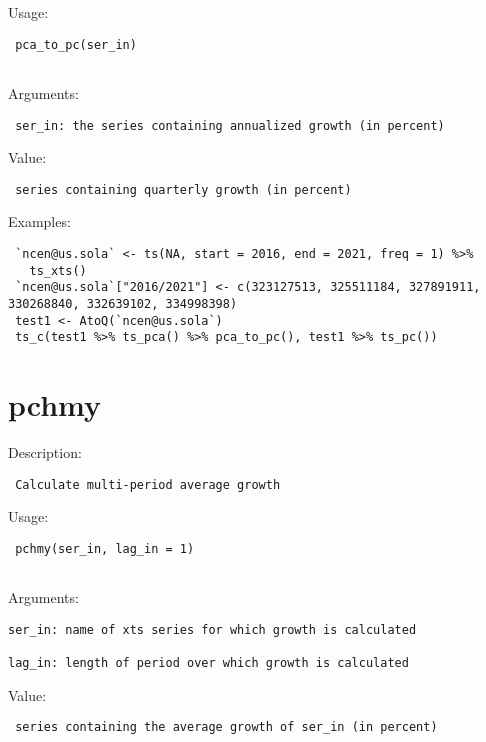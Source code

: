 \documentclass[
  letterpaper,
  DIV=11,
  numbers=noendperiod]{scrreport}
\begin{document}
Usage:

\begin{verbatim}
 pca_to_pc(ser_in)
 
\end{verbatim}

Arguments:

\begin{verbatim}
 ser_in: the series containing annualized growth (in percent)
\end{verbatim}

Value:

\begin{verbatim}
 series containing quarterly growth (in percent)
\end{verbatim}

Examples:

\begin{verbatim}
 `ncen@us.sola` <- ts(NA, start = 2016, end = 2021, freq = 1) %>% 
   ts_xts()
 `ncen@us.sola`["2016/2021"] <- c(323127513, 325511184, 327891911, 330268840, 332639102, 334998398)
 test1 <- AtoQ(`ncen@us.sola`)
 ts_c(test1 %>% ts_pca() %>% pca_to_pc(), test1 %>% ts_pc())
\end{verbatim}

\section{pchmy}\label{pchmy}

Description:

\begin{verbatim}
 Calculate multi-period average growth
\end{verbatim}

Usage:

\begin{verbatim}
 pchmy(ser_in, lag_in = 1)
 
\end{verbatim}

Arguments:

\begin{verbatim}
ser_in: name of xts series for which growth is calculated

lag_in: length of period over which growth is calculated
\end{verbatim}

Value:

\begin{verbatim}
 series containing the average growth of ser_in (in percent)
\end{verbatim}
\end{document}
